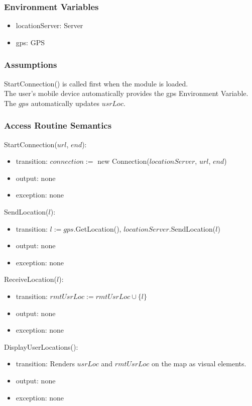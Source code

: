 \documentclass[12pt, titlepage]{article}
\begin{document}
\subsubsection{Environment Variables}
\begin{itemize}
\item locationServer: Server
\item gps: GPS
\end{itemize}

\subsubsection{Assumptions}

StartConnection() is called first when the module is loaded.\\
The user's mobile device automatically provides the gps Environment Variable.\\
The $gps$ automatically updates $usrLoc$.

\subsubsection{Access Routine Semantics}

\noindent StartConnection($url$, $end$):
\begin{itemize}
\item transition: $connection := $ new Connection($locationServer$, $url$, $end$)
\item output: none
\item exception: none
\end{itemize}

\noindent SendLocation($l$):
\begin{itemize}
\item transition: $l := gps$.GetLocation(), $locationServer$.SendLocation($l$)
\item output: none
\item exception: none
\end{itemize}

\noindent ReceiveLocation($l$):
\begin{itemize}
\item transition: $rmtUsrLoc := rmtUsrLoc \cup \{l\}$
\item output: none
\item exception: none
\end{itemize}

\noindent DisplayUserLocations():
\begin{itemize}
\item transition: Renders $usrLoc$ and $rmtUsrLoc$ on the map as visual elements.
\item output: none
\item exception: none
\end{itemize}
\end{document}
